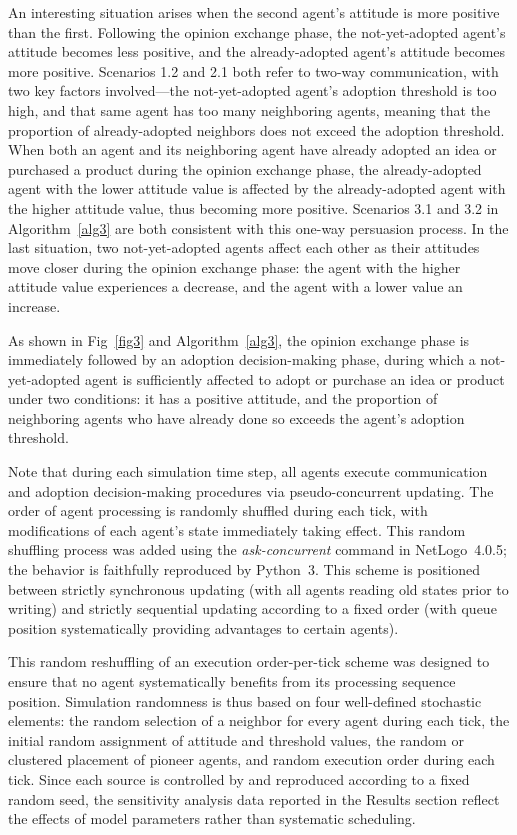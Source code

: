\documentclass[10pt,letterpaper]{article}
\begin{document}
An interesting situation arises when the second agent's attitude is more positive than the first. Following the opinion exchange phase, the not-yet-adopted agent's attitude becomes less positive, and the already-adopted agent's attitude becomes more positive. Scenarios 1.2 and 2.1 both refer to two-way communication, with two key factors involved---the not-yet-adopted agent's adoption threshold is too high, and that same agent has too many neighboring agents, meaning that the proportion of already-adopted neighbors does not exceed the adoption threshold. When both an agent and its neighboring agent have already adopted an idea or purchased a product during the opinion exchange phase, the already-adopted agent with the lower attitude value is affected by the already-adopted agent with the higher attitude value, thus becoming more positive. Scenarios 3.1 and 3.2 in Algorithm~\ref{alg3} are both consistent with this one-way persuasion process. In the last situation, two not-yet-adopted agents affect each other as their attitudes move closer during the opinion exchange phase: the agent with the higher attitude value experiences a decrease, and the agent with a lower value an increase.

As shown in Fig~\ref{fig3} and Algorithm~\ref{alg3}, the opinion exchange phase is immediately followed by an adoption decision-making phase, during which a not-yet-adopted agent is sufficiently affected to adopt or purchase an idea or product under two conditions: it has a positive attitude, and the proportion of neighboring agents who have already done so exceeds the agent's adoption threshold.

Note that during each simulation time step, all agents execute communication and adoption decision-making procedures via pseudo-concurrent updating. The order of agent processing is randomly shuffled during each tick, with modifications of each agent's state immediately taking effect. This random shuffling process was added using the \textit{ask-concurrent} command in NetLogo~4.0.5; the behavior is faithfully reproduced by Python~3. This scheme is positioned between strictly synchronous updating (with all agents reading old states prior to writing) and strictly sequential updating according to a fixed order (with queue position systematically providing advantages to certain agents).

This random reshuffling of an execution order-per-tick scheme was designed to ensure that no agent systematically benefits from its processing sequence position. Simulation randomness is thus based on four well-defined stochastic elements: the random selection of a neighbor for every agent during each tick, the initial random assignment of attitude and threshold values, the random or clustered placement of pioneer agents, and random execution order during each tick. Since each source is controlled by and reproduced according to a fixed random seed, the sensitivity analysis data reported in the Results section reflect the effects of model parameters rather than systematic scheduling.
\end{document}
